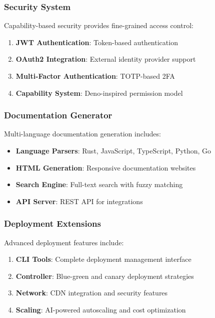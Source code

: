 \documentclass[11pt,a4paper]{article}
\begin{document}
\subsubsection{Security System}
\label{subsubsec:security_system}

Capability-based security provides fine-grained access control:

\begin{enumerate}
\item \textbf{JWT Authentication}: Token-based authentication
\item \textbf{OAuth2 Integration}: External identity provider support
\item \textbf{Multi-Factor Authentication}: TOTP-based 2FA
\item \textbf{Capability System}: Deno-inspired permission model
\end{enumerate}

\subsubsection{Documentation Generator}
\label{subsubsec:docs_generator}

Multi-language documentation generation includes:

\begin{itemize}
\item \textbf{Language Parsers}: Rust, JavaScript, TypeScript, Python, Go
\item \textbf{HTML Generation}: Responsive documentation websites
\item \textbf{Search Engine}: Full-text search with fuzzy matching
\item \textbf{API Server}: REST API for integrations
\end{itemize}

\subsubsection{Deployment Extensions}
\label{subsubsec:deployment_extensions}

Advanced deployment features include:

\begin{enumerate}
\item \textbf{CLI Tools}: Complete deployment management interface
\item \textbf{Controller}: Blue-green and canary deployment strategies
\item \textbf{Network}: CDN integration and security features
\item \textbf{Scaling}: AI-powered autoscaling and cost optimization
\end{enumerate}
\end{document}
